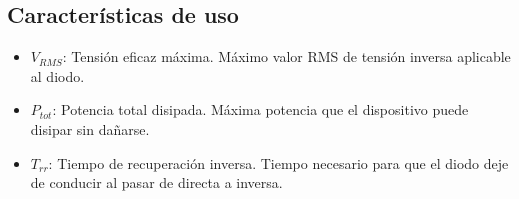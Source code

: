 \subsection{Características de uso}

\begin{itemize}

    \item $V_{RMS}$: Tensión eficaz máxima.  
    Máximo valor RMS de tensión inversa aplicable al diodo. 
    \item $P_{tot}$: Potencia total disipada.
    Máxima potencia que el dispositivo puede disipar sin dañarse.  
    \item $T_{rr}$: Tiempo de recuperación inversa.  
    Tiempo necesario para que el diodo deje de conducir al pasar de directa a inversa.  
\end{itemize}